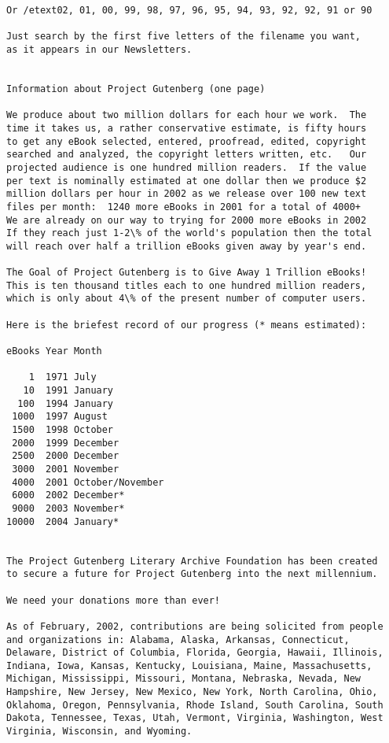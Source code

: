 \documentclass[oneside]{book}
\begin{document}
{\begin{verbatim}
Or /etext02, 01, 00, 99, 98, 97, 96, 95, 94, 93, 92, 92, 91 or 90

Just search by the first five letters of the filename you want,
as it appears in our Newsletters.


Information about Project Gutenberg (one page)

We produce about two million dollars for each hour we work.  The
time it takes us, a rather conservative estimate, is fifty hours
to get any eBook selected, entered, proofread, edited, copyright
searched and analyzed, the copyright letters written, etc.   Our
projected audience is one hundred million readers.  If the value
per text is nominally estimated at one dollar then we produce $2
million dollars per hour in 2002 as we release over 100 new text
files per month:  1240 more eBooks in 2001 for a total of 4000+
We are already on our way to trying for 2000 more eBooks in 2002
If they reach just 1-2\% of the world's population then the total
will reach over half a trillion eBooks given away by year's end.

The Goal of Project Gutenberg is to Give Away 1 Trillion eBooks!
This is ten thousand titles each to one hundred million readers,
which is only about 4\% of the present number of computer users.

Here is the briefest record of our progress (* means estimated):

eBooks Year Month

    1  1971 July
   10  1991 January
  100  1994 January
 1000  1997 August
 1500  1998 October
 2000  1999 December
 2500  2000 December
 3000  2001 November
 4000  2001 October/November
 6000  2002 December*
 9000  2003 November*
10000  2004 January*


The Project Gutenberg Literary Archive Foundation has been created
to secure a future for Project Gutenberg into the next millennium.

We need your donations more than ever!

As of February, 2002, contributions are being solicited from people
and organizations in: Alabama, Alaska, Arkansas, Connecticut,
Delaware, District of Columbia, Florida, Georgia, Hawaii, Illinois,
Indiana, Iowa, Kansas, Kentucky, Louisiana, Maine, Massachusetts,
Michigan, Mississippi, Missouri, Montana, Nebraska, Nevada, New
Hampshire, New Jersey, New Mexico, New York, North Carolina, Ohio,
Oklahoma, Oregon, Pennsylvania, Rhode Island, South Carolina, South
Dakota, Tennessee, Texas, Utah, Vermont, Virginia, Washington, West
Virginia, Wisconsin, and Wyoming.


\end{verbatim}}
\end{document}
